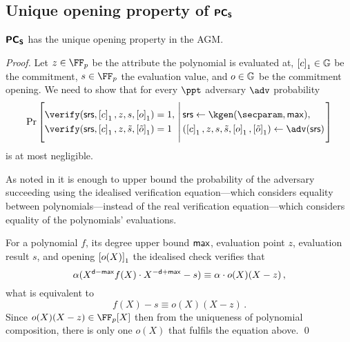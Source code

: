 \documentclass[runningheads,11pt]{llncs}
\begin{document}
\subsection{Unique opening property of $\bm{\mathsf{PC}}_{\bm{\mathsf{S}}}$}
\begin{lemma}
\label{lem:pcoms_unique_op}
$\bm{\mathsf{PC}}_{\bm{\mathsf{S}}}$ has the unique opening property in the AGM. 
\end{lemma}
\begin{proof}
Let 
$z \in \FF_p$ be the attribute the polynomial is evaluated at,
$\left[c\right]_{1} \in \mathbb{G}$ be the commitment,  
$s \in \FF_p$ the evaluation value, and 
$o \in \mathbb{G}$ be the commitment opening. 
We need to show that for every $\ppt$ adversary $\adv$ probability
\[
  \Pr \left[
    \begin{aligned}
      & \verify(\srs, \gone{c}, z, s, \gone{o}) = 1, \\
      & \verify(\srs, \gone{c}, z, \tilde{s}, \gone{\tilde{o}}) = 1
    \end{aligned}
    \,\left|\, \vphantom{\begin{aligned}
          & \verify(\srs, \gone{c}, z, s, \gone{o}),\\
          & \verify(\srs, \gone{c}, z, \tilde{s}, \gone{\tilde{o}}) \\
          &o \neq \tilde{o})
		\end{aligned}}
      \begin{aligned}
        & \srs \gets \kgen(\secparam, \maxdeg), \\
        & (\gone{c}, z, s, \tilde{s}, \gone{o}, \gone{\tilde{o}}) \gets \adv(\srs)
      \end{aligned}
    \right.\right]
\]
is at most negligible.

As noted in \cite[Lemma 2.2]{EPRINT:GabWilCio19} it is enough to upper bound the
probability of the adversary succeeding using the idealised verification
equation---which considers equality between polynomials---instead of the real
verification equation---which considers equality of the polynomials' evaluations.

For a polynomial $f$, its degree upper bound $\mathsf{max}$, evaluation point $z$,
evaluation result $s$, and opening $\left[o(X)\right]_{1}$ the idealised check verifies that
\begin{equation}
  \alpha (X^{\mathsf{d} - \mathsf{max}}f(X) \cdot X^{-\mathsf{d} + \mathsf{max}} -  s) \equiv \alpha \cdot o(X) (X - z)\,,
\end{equation}
what is equivalent to 
\begin{equation}
	f(X) -  s \equiv o(X) (X - z)\,.
	\label{eq:pcoms_idealised_check}
\end{equation}
Since $o(X)(X - z) \in \FF_p[X]$ then from the uniqueness of polynomial
composition, there is only one $o(X)$ that fulfils the equation above.
\qed
\end{proof}
\end{document}
